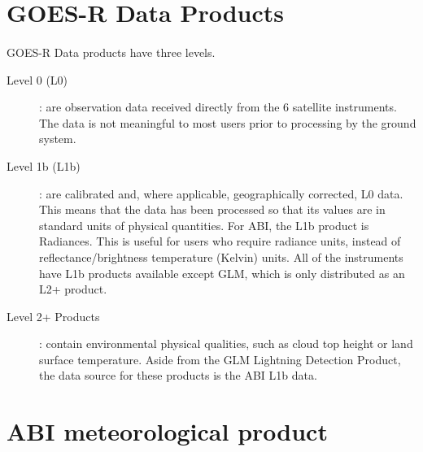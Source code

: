\section{GOES-R Data Products}
\paragraph{}
GOES-R Data products have three levels.
\begin{description}
\item [Level 0 (L0)] : are observation data received directly from the 6 satellite instruments. The data is not meaningful to most users prior to processing by the ground system.
\item [Level 1b (L1b)] : are calibrated and, where applicable, geographically corrected, L0 data. This means that the data has been processed so that its values are in standard units of physical quantities. For ABI, the L1b product is Radiances.
This is useful for users who require radiance units, instead of reflectance/brightness temperature (Kelvin) units.
All of the instruments have L1b products available except GLM, which is only distributed as an L2+ product.
\item [Level 2+ Products] : contain environmental physical qualities, such as cloud top height or land surface temperature.
Aside from the GLM Lightning Detection Product, the data source for these products is the ABI L1b data.
\end{description}
\section{ABI meteorological product}
